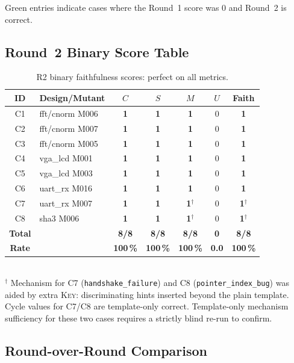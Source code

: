 \documentclass[11pt,a4paper]{article}
\newcommand{\yes}{\textcolor{killgreen}{\textbf{1}}}
\begin{document}
\noindent Green entries indicate cases where the Round~1 score was 0 and
Round~2 is correct.

\subsection{Round~2 Binary Score Table}

\begin{table}[H]
\centering
\caption{R2 binary faithfulness scores: perfect on all metrics.}
\label{tab:r2_scores}
\begin{tabular}{clccccc}
\toprule
\textbf{ID} & \textbf{Design/Mutant} & $C$ & $S$ & $M$ & $U$ &
  \textbf{Faith} \\
\midrule
C1 & fft/cnorm M006  & \yes & \yes & \yes & 0 & \yes \\
C2 & fft/cnorm M007  & \yes & \yes & \yes & 0 & \yes \\
C3 & fft/cnorm M005  & \yes & \yes & \yes & 0 & \yes \\
C4 & vga\_lcd M001   & \yes & \yes & \yes & 0 & \yes \\
C5 & vga\_lcd M003   & \yes & \yes & \yes & 0 & \yes \\
C6 & uart\_rx M016   & \yes & \yes & \yes & 0 & \yes \\
C7 & uart\_rx M007   & \yes & \yes & \yes$^{\dagger}$ & 0 & \yes$^{\dagger}$ \\
C8 & sha3 M006       & \yes & \yes & \yes$^{\dagger}$ & 0 & \yes$^{\dagger}$ \\
\midrule
\textbf{Total} & & \textbf{8/8} & \textbf{8/8} & \textbf{8/8} & \textbf{0} &
  \textbf{8/8} \\
\textbf{Rate}  & & \textbf{100\,\%} & \textbf{100\,\%} & \textbf{100\,\%} &
  \textbf{0.0} & \textbf{100\,\%} \\
\bottomrule
\end{tabular}
\smallskip\\
{$^{\dagger}$ Mechanism for C7 (\texttt{handshake\_failure}) and C8 (\texttt{pointer\_index\_bug})
  was aided by extra \textsc{Key:} discriminating hints inserted beyond the plain template.
  Cycle values for C7/C8 are template-only correct. Template-only mechanism sufficiency
  for these two cases requires a strictly blind re-run to confirm.}
\end{table}

\subsection{Round-over-Round Comparison}
\end{document}
